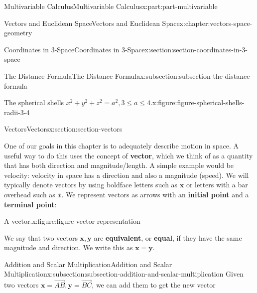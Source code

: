 \documentclass[twoside,10pt,]{tufte-book}
\newcommand{\terminology}[1]{\textbf{#1}}
\numberwithin{equation}{part}
\begin{document}
\begin{partptx}{Multivariable Calculus}{}{Multivariable Calculus}{}{}{x:part:part-multivariable}
\begin{chapterptx}{Vectors and Euclidean Space}{}{Vectors and Euclidean Space}{}{}{x:chapter:vectors-space-geometry}
\begin{sectionptx}{Coordinates in 3-Space}{}{Coordinates in 3-Space}{}{}{x:section:section-coordinates-in-3-space}
\begin{subsectionptx}{The Distance Formula}{}{The Distance Formula}{}{}{x:subsection:subsection-the-distance-formula}
\begin{figureptx}{The spherical shells \(x^2 + y^2 + z^2 = a^2, 3\leq a\leq 4\).}{x:figure:figure-spherical-shells-radii-3-4}{}
\begin{tcbraster}[raster columns=2, raster column skip=1pt, raster halign=center, raster force size=false, raster left skip=0pt, raster right skip=0pt]
\begin{tcolorbox}[qrstyle]
\end{tcolorbox}%
\end{tcbraster}%
\tcblower
\end{figureptx}%
\end{subsectionptx}
\end{sectionptx}
%
%
\typeout{************************************************}
\typeout{************************************************}
%
\begin{sectionptx}{Vectors}{}{Vectors}{}{}{x:section:section-vectors}
\begin{introduction}{}%
One of our goals in this chapter is to adequately describe motion in space. A useful way to do this uses the concept of \terminology{vector}, which we think of as a quantity that has both direction and magnitude\slash{}length. A simple example would be velocity: velocity in space has a direction and also a magnitude (speed). We will typically denote vectors by using boldface letters such as \(\mathbf{x}\) or letters with a bar overhead such as \(\bar{x}\). We represent vectors as arrows with an \terminology{initial point} and a \terminology{terminal point}:%
\begin{figureptx}{A vector.}{x:figure:figure-vector-representation}{}%
\begin{image}{0.4}{0.2}{0.4}%
%
\end{image}%
\tcblower
\end{figureptx}%
We say that two vectors \(\mathbf{x},\mathbf{y}\) are \terminology{equivalent}, or \terminology{equal}, if they have the same magnitude and direction. We write this as \(\mathbf{x} = \mathbf{y}\).%
\end{introduction}%
%
%
\typeout{************************************************}
\typeout{************************************************}
%
\begin{subsectionptx}{Addition and Scalar Multiplication}{}{Addition and Scalar Multiplication}{}{}{x:subsection:subsection-addition-and-scalar-multiplication}
Given two vectors \(\mathbf{x} = \overrightarrow{AB},\mathbf{y}=\overrightarrow{BC}\), we can add them to get the new vector%
%
\begin{equation*}

\end{equation*}
\end{subsectionptx}
\end{sectionptx}
\end{chapterptx}
\end{partptx}
\end{document}
